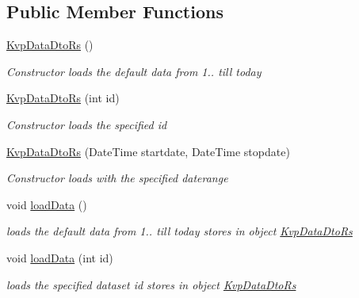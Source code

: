 \subsection*{Public Member Functions}
\begin{DoxyCompactItemize}
\item 
\hyperlink{classkpi_mvc_api_1_1_data_transfer_objects_1_1_kvp_data_dto_rs_a8189fa1bf44fd56db7b2df7895373be4}{Kvp\+Data\+Dto\+Rs} ()
\begin{DoxyCompactList}\small\item\em Constructor loads the default data from 1.. till today \end{DoxyCompactList}\item 
\hyperlink{classkpi_mvc_api_1_1_data_transfer_objects_1_1_kvp_data_dto_rs_ab2f376c9184bcbb70716826a51e774e8}{Kvp\+Data\+Dto\+Rs} (int id)
\begin{DoxyCompactList}\small\item\em Constructor loads the specified id \end{DoxyCompactList}\item 
\hyperlink{classkpi_mvc_api_1_1_data_transfer_objects_1_1_kvp_data_dto_rs_a4d9df8d729c0009c23968a0250d45dcc}{Kvp\+Data\+Dto\+Rs} (Date\+Time startdate, Date\+Time stopdate)
\begin{DoxyCompactList}\small\item\em Constructor loads with the specified daterange \end{DoxyCompactList}\item 
void \hyperlink{classkpi_mvc_api_1_1_data_transfer_objects_1_1_kvp_data_dto_rs_a562207c4315e1f552734257d994cc2d5}{load\+Data} ()
\begin{DoxyCompactList}\small\item\em loads the default data from 1.. till today stores in object {\ttfamily \hyperlink{classkpi_mvc_api_1_1_data_transfer_objects_1_1_kvp_data_dto_rs}{Kvp\+Data\+Dto\+Rs}} \end{DoxyCompactList}\item 
void \hyperlink{classkpi_mvc_api_1_1_data_transfer_objects_1_1_kvp_data_dto_rs_a7c0a2f992ea673548b507ee6a74e4046}{load\+Data} (int id)
\begin{DoxyCompactList}\small\item\em loads the specified dataset id stores in object {\ttfamily \hyperlink{classkpi_mvc_api_1_1_data_transfer_objects_1_1_kvp_data_dto_rs}{Kvp\+Data\+Dto\+Rs}} \end{DoxyCompactList}\item 

\end{DoxyCompactItemize}
